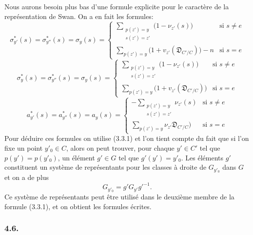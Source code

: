 \documentclass[11pt]{article}
\begin{document}
Nous
aurons besoin plus bas d'une formule explicite pour le caractère de la représentation de Swan. On a en fait les formules:
\[
\sigma^{*}_{y'}(s)=\sigma^{*}_{y''}(s)=\sigma_y(s)=
\begin{cases}
\displaystyle\sum_{\substack{p(z')=y\\s(z')=z'}}\bigl(1-\nu_{z'}(s)\bigr)& \text{si } s\ne e\\[0.8em]
\displaystyle\sum_{p(z')=y}\bigl(1+v_{z'}(\mathfrak D_{C'/C})\bigr)-n& \text{si } s=e
\end{cases}
\tag{4.5.1}
\]
\[
\sigma^{*}_{y}(s)=\sigma^{*}_{y''}(s)=\sigma_y(s)=
\begin{cases}
\displaystyle\sum_{\substack{p(z')=y\\s(z')=z'}}\bigl(1-\nu_{z'}(s)\bigr)& \text{si } s\ne e\\[0.8em]
\displaystyle\sum_{p(z')=y}\bigl(1+v_{z'}(\mathfrak D_{C'/C})\bigr)& \text{si } s=e
\end{cases}
\tag{4.5.2}
\]
\[
a^{*}_{y'}(s)=a^{*}_{y''}(s)=a_y(s)=
\begin{cases}
\displaystyle-\sum_{\substack{p(z')=y\\s(z')=z'}}\nu_{z'}(s)& \text{si } s\ne e\\[0.8em]
\displaystyle\sum_{p(z')=y}\nu_{z'}\mathfrak D_{C'/C})& \text{si } s=e
\end{cases}
\tag{4.5.3}
\]
Pour déduire ces formules on utilise (3.3.1) et l'on tient compte du fait que si l'on fixe un point $y'_0\in C$, alors on peut trouver, pour chaque $y'\in C'$ tel que $p(y')=p(y'_0)$, un élément $g'\in G$ tel que $g'(y')=y'_0$. Les éléments $g'$ constituent un système de représentants pour les classes à droite de $G_{y'_0}$ dans $G$ et on a de plus
\[
G_{y'_0}=g'G_{y'}g'^{-1}.
\]
Ce système de représentants peut être utilisé dans le deuxième membre de la formule (3.3.1), et on obtient les formules écrites.

\subsubsection*{4.6.}
\end{document}
